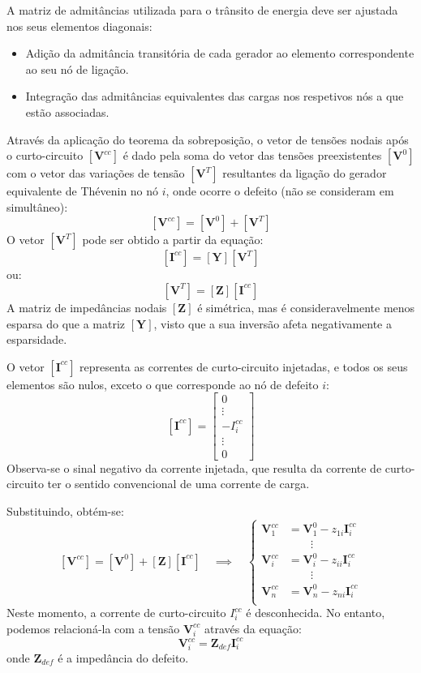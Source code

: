 \noindent A matriz de admitâncias utilizada para o trânsito de energia deve ser ajustada nos seus elementos diagonais:

\begin{itemize}
    \item Adição da admitância transitória de cada gerador ao elemento correspondente ao seu nó de ligação.
    \item Integração das admitâncias equivalentes das cargas nos respetivos nós a que estão associadas.
\end{itemize}

\noindent Através da aplicação do teorema da sobreposição, o vetor de tensões nodais após o curto-circuito $[\mathbf{V}^{cc}]$ é dado pela soma do vetor das tensões preexistentes $[\mathbf{V}^0]$ com o vetor das variações de tensão $[\mathbf{V}^T]$ resultantes da ligação do gerador equivalente de Thévenin no nó $i$, onde ocorre o defeito (não se consideram em simultâneo):
$$
    [\mathbf{V}^{cc}] = [\mathbf{V}^0] + [\mathbf{V}^T]
$$
O vetor $[\mathbf{V}^T]$ pode ser obtido a partir da equação:
$$
    [\mathbf{I}^{cc}] = [\mathbf{Y}] [\mathbf{V}^T]
$$
ou:
$$
    [\mathbf{V}^T] = [\mathbf{Z}][\mathbf{I}^{cc}]
$$
A matriz de impedâncias nodais $[\mathbf{Z}]$ é simétrica, mas é consideravelmente menos esparsa do que a matriz $[\mathbf{Y}]$, visto que a sua inversão afeta negativamente a esparsidade.

O vetor $[\mathbf{I}^{cc}]$ representa as correntes de curto-circuito injetadas, e todos os seus elementos são nulos, exceto o que corresponde ao nó de defeito $i$:
$$
    [\mathbf{I}^{cc}] = 
    \begin{bmatrix}
        0 \\
        \vdots \\
        -I^{cc}_i \\
        \vdots \\
        0
    \end{bmatrix}
$$
Observa-se o sinal negativo da corrente injetada, que resulta da corrente de curto-circuito ter o sentido convencional de uma corrente de carga.

\vspace{0.5em}
\noindent Substituindo, obtém-se:
$$
    [\mathbf{V}^{cc}] = [\mathbf{V}^0] + [\mathbf{Z}] [\mathbf{I}^{cc}]
    \quad\implies\quad
    \left\{\begin{aligned}
        \mathbf{V}^{cc}_1 &= \mathbf{V}^0_1 - z_{1i} \mathbf{I}^{cc}_i \\
        &\qquad\vdots \\
        \mathbf{V}^{cc}_i &= \mathbf{V}^0_i - z_{ii} \mathbf{I}^{cc}_i \\
        &\qquad\vdots \\
        \mathbf{V}^{cc}_n &= \mathbf{V}^0_n - z_{ni} \mathbf{I}^{cc}_i \\
    \end{aligned}\right.
$$
\noindent Neste momento, a corrente de curto-circuito $I^{cc}_i$ é desconhecida. No entanto, podemos relacioná-la com a tensão $\mathbf{V}^{cc}_i$ através da equação:
$$
\mathbf{V}^{cc}_i = \mathbf{Z}_{def} \mathbf{I}_i^{cc}
$$
onde $\mathbf{Z}_{def}$ é a impedância do defeito.

